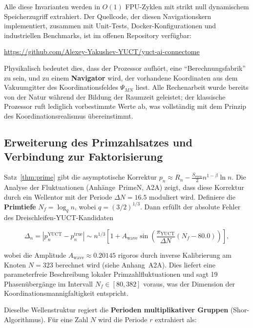 \documentclass[12pt,a4paper]{article}
\theoremstyle{remark}
\newcommand{\piYUCT}{\pi_{\mathrm{YUCT}}}
\begin{document}
	Alle diese Invarianten werden in \(O(1)\) FPU-Zyklen mit strikt null
	dynamischem Speicherzugriff extrahiert. Der Quellcode, der diesen Navigationskern
	implementiert, zusammen mit Unit-Tests, Docker-Konfigurationen und
	industriellen Benchmarks, ist im offenen Repository verfügbar:
	
	\begin{center}
		\url{https://github.com/Alexey-Yakushev-YUCT/yuct-ai-connectome}
	\end{center}
	
	Physikalisch bedeutet dies, dass der Prozessor aufhört, eine
	``Berechnungsfabrik'' zu sein, und zu einem \textbf{Navigator} wird, der
	vorhandene Koordinaten aus dem Vakuumgitter des Koordinationsfeldes \(\Psi_{MN}\)
	liest. Alle Rechenarbeit wurde bereits von der Natur während der Bildung der
	Raumzeit geleistet; der klassische Prozessor ruft lediglich vorbestimmte Werte
	ab, was vollständig mit dem Prinzip des Koordinationsrealismus übereinstimmt.
	
	\subsection{Erweiterung des Primzahlsatzes und Verbindung zur Faktorisierung}
	\label{subsec:prime-extension}
	
	Satz~\ref{thm:prime} gibt die asymptotische Korrektur
	\(p_n \approx R_n - \frac{S_{\mathrm{even}}}{2} n^{1-\beta}\ln n\). Die
	Analyse der Fluktuationen (Anhänge~PrimeN, A2A) zeigt, dass diese Korrektur
	durch ein Wellentor mit der Periode \(\Delta N = 16.5\) moduliert wird. Definiere
	die \textbf{Primtiefe} \(N_f = \log_q n\), wobei \(q = (3/2)^{1/3}\).
	Dann erfüllt der absolute Fehler des Dreischleifen-YUCT-Kandidaten
	
	\begin{equation}
		\Delta_n = \left| p_n^{\mathrm{YUCT}} - p_n^{\mathrm{true}} \right|
		\sim n^{1/3} \left[ 1 + A_{\text{wave}} \sin\!\left( \frac{\piYUCT}{\Delta N} (N_f - 80.0) \right) \right],
		\label{eq:prime_wave}
	\end{equation}
	
	wobei die Amplitude \(A_{\text{wave}} \approx 0.20145\) rigoros durch inverse
	Kalibrierung am Knoten \(N=323\) berechnet wird (siehe Anhang~A2A). Dies liefert
	eine parameterfreie Beschreibung lokaler Primzahlfluktuationen und sagt
	19 Phasenübergänge im Intervall \(N_f \in [80, 382]\) voraus, was der Dimension
	der Koordinationsmannigfaltigkeit entspricht.
	
	Dieselbe Wellenstruktur regiert die \textbf{Perioden multiplikativer Gruppen}
	(Shor-Algorithmus). Für eine Zahl \(N\) wird die Periode \(r\) extrahiert als:
	
\end{document}
